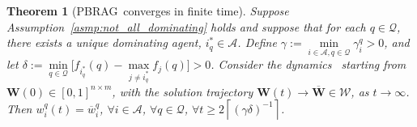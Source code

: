 \documentclass{IEEEtran}
\newcommand{\ldef}{:=}
\newcommand{\Mcal}[1]{\mathcal{#1}}
\newcommand{\Mc}[1]{\mathcal{#1}}
\newcommand{\bld}[1]{\mathbf{#1}}
\newcommand{\thmtitle}[1]{\mbox{}\emph{(#1).}}
\newtheorem{theorem}{Theorem}[section]
\newcommand{\integer}{\ensuremath{\mathbb{Z}}}
\renewcommand{\bar}[1]{\overline{#1}}
\def \agt{\Mcal{A}}
\def \eqpt{\Mcal{W}}
\def \integer{\mathbb{Z}}
\def \intpos{\integer_{\geq 0}}
\def \kcell{[0,1]}
\def \tsk{\Mc{Q}}
\def \w{\bld{w}}
\def \W{\bld{W}}
\def \wb{\overline{\w}}
\def \Wb{\bar{\W}}
\def \dynacr{PBRAG}
\begin{document}
\begin{theorem}[\dynacr\, converges in finite
  time]\label{th:finite_time_wt_converge}
%
%
Suppose Assumption~\ref{asmp:not_all_dominating} holds and
  suppose that for each $q \in \tsk$, there exists a unique dominating
  agent, $i_q^* \in \agt$.  Define
  $\gamma \ldef \min\limits_{i \in \agt, q\in \tsk} \gamma^q_i > 0$,
  and let
  $\delta \ldef \min\limits_{q \in \tsk} \big[ f_{i^*_q}(q) -
  \max\limits_{j \neq i^*_q} f_j(q) \big] > 0$.
  Consider the dynamics~
  starting from $\W(0) \in \kcell^{n \times m}$, with the solution trajectory
  $\W(t)\rightarrow \Wb \in \eqpt$, as $t\rightarrow \infty$.  Then $w^q_i(t) = \bar{w}^q_i$,
  $\forall i \in \agt$, $\forall q \in \tsk$,
  $\forall t \geq 2\left\lceil(\gamma\delta)^{-1}
  \right\rceil$. %
\end{theorem} 
\end{document}
